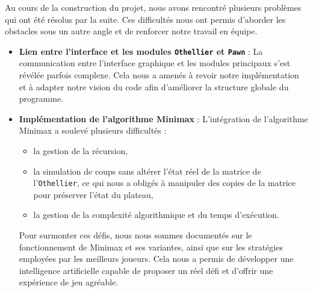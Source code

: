 \documentclass[a4paper,12pt]{article}
\begin{document}
Au cours de la construction du projet, nous avons rencontré plusieurs problèmes qui ont été résolus par la suite. Ces difficultés nous ont permis d’aborder les obstacles sous un autre angle et de renforcer notre travail en équipe.

\begin{itemize}
    \item \textbf{Lien entre l'interface et les modules \texttt{Othellier} et \texttt{Pawn}} :  
    La communication entre l’interface graphique et les modules principaux s’est révélée parfois complexe. Cela nous a amenés à revoir notre implémentation et à adapter notre vision du code afin d'améliorer la structure globale du programme.

    \item \textbf{Implémentation de l’algorithme Minimax} :  
    L'intégration de l'algorithme Minimax a soulevé plusieurs difficultés :
    \begin{itemize}
        \item la gestion de la récursion, 
        \item la simulation de coups sans altérer l’état réel de la matrice de l’\texttt{Othellier}, ce qui nous a obligés à manipuler des copies de la matrice pour préserver l'état du plateau,
        \item la gestion de la complexité algorithmique et du temps d'exécution.
    \end{itemize}
    Pour surmonter ces défis, nous nous sommes documentés sur le fonctionnement de Minimax et ses variantes, ainsi que sur les stratégies employées par les meilleurs joueurs. Cela nous a permis de développer une intelligence artificielle capable de proposer un réel défi et d’offrir une expérience de jeu agréable.
\end{itemize}
\end{document}

